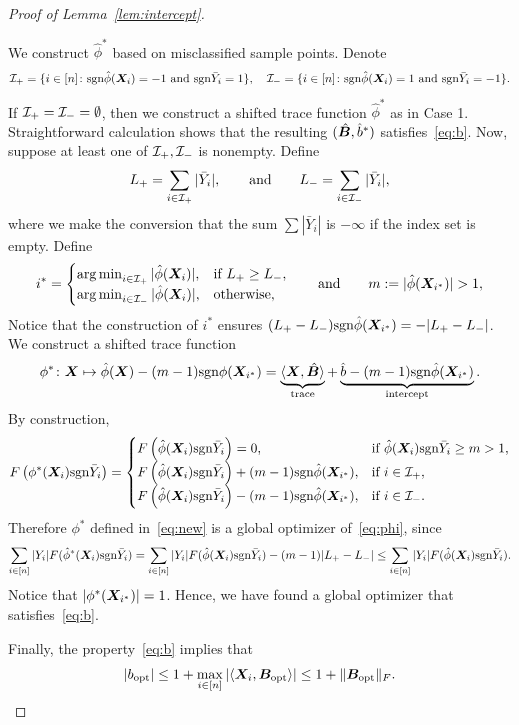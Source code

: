 \documentclass[11pt]{article}
\newcommand*{\KeepStyleUnderBrace}[1]{%
\mathop{%
\mathchoice
{\underbrace{\displaystyle#1}}%
{\underbrace{\textstyle#1}}%
{\underbrace{\scriptstyle#1}}%
{\underbrace{\scriptscriptstyle#1}}%
}\limits
}
\theoremstyle{plain}
\theoremstyle{definition}
\def\sign{\textup{sgn}}
\begin{document}
\begin{proof}[Proof of Lemma~\ref{lem:intercept}]
\begin{enumerate}[label={2.\arabic*},wide, labelwidth=!, labelindent=0pt]
We construct $\hat \phi^*$ based on misclassified sample points. Denote
\[
\tI_+=\{i\in[n]\colon \sign \hat \phi(\mX_i)=-1 \text{ and } \sign \bar Y_i=1\},\quad \tI_-=\{i\in[n]\colon \sign \hat \phi(\mX_i)=1 \text{ and } \sign \bar Y_i=-1\}.
\]
If $\mathcal{I}_+=\mathcal{I}_-=\emptyset$, then we construct a shifted trace function $\hat \phi^*$ as in Case 1. Straightforward calculation shows that the resulting $(\hat {\bm B}, \hat b^*)$ satisfies~\eqref{eq:b}. Now, suppose at least one of $\mathcal{I}_+, \mathcal{I}_-$ is nonempty. Define
\[
L_+=\sum_{i\in\mathcal{I}_+}|\bar Y_i|,\quad \quad \text{and}\quad \quad L_-=\sum_{i\in\mathcal{I}_-}|\bar Y_i|,
\]
where we make the conversion that the sum $\sum|\bar Y_i|$ is $-\infty$ if the index set is empty.  Define
\[
i^*=
\begin{cases}
\argmin_{i\in \tI_+}|\hat \phi(\mX_i)|, & \text{if }L_+\geq L_-,\\
\argmin_{i\in \tI_-}|\hat \phi(\mX_i)|, & \text{otherwise},\\
\end{cases}
\quad \quad \text{and}\quad \quad m:= |\hat \phi(\mX_{i^*})|>1,
\]
Notice that the construction of $i^*$ ensures $(L_+-L_-)\sign \hat \phi(\mX_{i^*})=-|L_+-L_-|$. We construct a shifted trace function
\begin{equation}\label{eq:new}
\phi^*\colon \mX\mapsto \hat \phi(\mX) - (m-1)\sign\phi(\mX_{i^*}) = \KeepStyleUnderBrace{\langle \mX, \hat \mB \rangle}_{\text{trace}}+\KeepStyleUnderBrace{\hat b -(m-1)\sign\hat \phi(\mX_{i^*}) }_{\text{intercept}}.
\end{equation}
By construction, 
\[
F\left(\phi^*(\mX_i)\sign \bar Y_{i}\right)=
\begin{cases}
F\left(\hat \phi(\mX_i)\sign \bar Y_{i}\right)=0,   & \text{if $\hat \phi(\mX_i) \sign \bar Y_i\geq m>1$},\\
F\left(\hat \phi(\mX_i)\sign \bar Y_{i}\right)+(m-1)\sign\hat \phi(\mX_{i^*}),   & \text{if }i\in \tI_{+},\\
F\left(\hat \phi(\mX_i)\sign \bar Y_{i}\right)-(m-1)\sign\hat \phi(\mX_{i^*}),   & \text{if }i\in \tI_{-}.\\
\end{cases}
\]
Therefore $\phi^*$ defined in~\eqref{eq:new} is a global optimizer of~\eqref{eq:phi}, since
\[
\sum_{i\in[n]}|Y_i|F(\hat \phi^*(\mX_i)\sign \bar Y_i) =\sum_{i\in[n]}|Y_i|F(\hat \phi(\mX_i)\sign \bar Y_i) - (m-1)|L_{+}-L_{-}| \leq \sum_{i\in [n]}|Y_i|F(\hat \phi(\mX_i)\sign \bar Y_i).
\]
Notice that $|\phi^*(\bm X_{i^*})|=1$. Hence, we have found a global optimizer that satisfies~\eqref{eq:b}.
\end{enumerate}
Finally, the property~\eqref{eq:b} implies that
\[
|b_\text{opt}|\leq 1+\max_{i\in[n]}|\langle \bm X_i, \bm B_{\text{opt}}\rangle|\leq 1+\lVert\bm B_{\text{opt}}\rVert_F.
\]
\end{proof}
\end{document}
